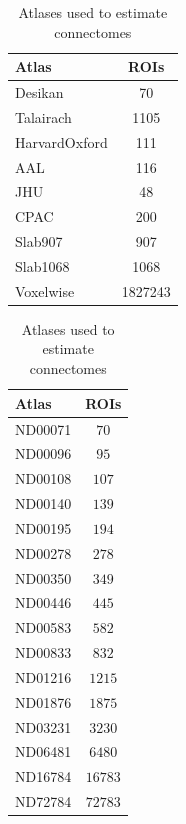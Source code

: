 \begin{table}[h!]
\centering
\begin{tabular}{| l | c |}
\hline
\textbf{Atlas}	& \textbf{ROIs} \\ \hline \hline
Desikan & 70 \\
Talairach & 1105 \\
HarvardOxford & 111 \\
AAL & 116 \\
JHU & 48 \\
CPAC & 200 \\
Slab907 & 907 \\
Slab1068 & 1068\\ 
Voxelwise & 1827243 \\ \hline
\end{tabular}
\quad 
\begin{tabular}{| l | c |}
\hline
\textbf{Atlas} & \textbf{ROIs} \\ \hline \hline
ND00071 & $70$  \\
ND00096 & $95$ \\
ND00108 & $107$ \\
ND00140 & $139$ \\
ND00195 & $194$ \\
ND00278 & $278$ \\
ND00350 & $349$ \\
ND00446 & $445$ \\
ND00583 & $582$ \\
ND00833 & $832$ \\
ND01216 & $1215$ \\
ND01876 & $1875$ \\
ND03231 & $3230$ \\
ND06481 & $6480$ \\
ND16784 & $16783$ \\
ND72784 & $72783$ \\ \hline
\end{tabular}
\makeatletter
\let\@currsize\normalsize
\caption{Atlases used to estimate connectomes}
   	\label{tab:atlas}
\end{table}

